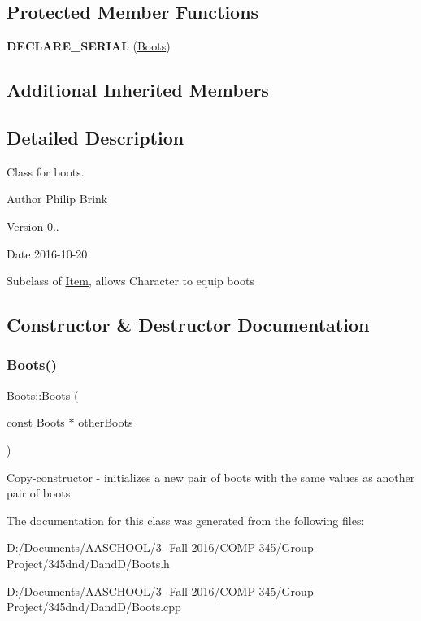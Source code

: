 \subsection*{Protected Member Functions}
\begin{DoxyCompactItemize}
\item 
\hypertarget{class_boots_a067d801af4bd7abb26c9f11970246ed8}{}\label{class_boots_a067d801af4bd7abb26c9f11970246ed8} 
{\bfseries D\+E\+C\+L\+A\+R\+E\+\_\+\+S\+E\+R\+I\+AL} (\hyperlink{class_boots}{Boots})
\end{DoxyCompactItemize}
\subsection*{Additional Inherited Members}


\subsection{Detailed Description}
Class for boots. 

\begin{DoxyAuthor}{Author}
Philip Brink 
\end{DoxyAuthor}
\begin{DoxyVersion}{Version}
0.. 
\end{DoxyVersion}
\begin{DoxyDate}{Date}
2016-\/10-\/20
\end{DoxyDate}
Subclass of \hyperlink{class_item}{Item}, allows Character to equip boots 

\subsection{Constructor \& Destructor Documentation}
\hypertarget{class_boots_ad3452c78ef60ba4d955e779560d5e5ba}{}\label{class_boots_ad3452c78ef60ba4d955e779560d5e5ba} 
\subsubsection{\texorpdfstring{Boots()}{Boots()}}
{\footnotesize\ttfamily Boots\+::\+Boots (\begin{DoxyParamCaption}\item[{const \hyperlink{class_boots}{Boots} $\ast$}]{other\+Boots }\end{DoxyParamCaption})}

Copy-\/constructor -\/ initializes a new pair of boots with the same values as another pair of boots 

The documentation for this class was generated from the following files\+:\begin{DoxyCompactItemize}
\item 
D\+:/\+Documents/\+A\+A\+S\+C\+H\+O\+O\+L/3-\/ Fall 2016/\+C\+O\+M\+P 345/\+Group Project/345dnd/\+Dand\+D/Boots.\+h\item 
D\+:/\+Documents/\+A\+A\+S\+C\+H\+O\+O\+L/3-\/ Fall 2016/\+C\+O\+M\+P 345/\+Group Project/345dnd/\+Dand\+D/Boots.\+cpp\end{DoxyCompactItemize}
